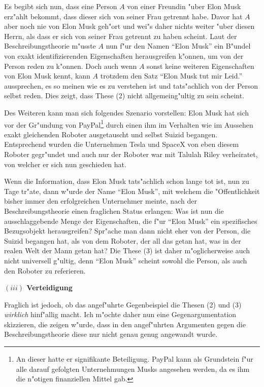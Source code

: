 \documentclass[a4paper, emulatestandardclasses, 12pt]{scrartcl}
\begin{document}
\begin{onehalfspace}
Es begibt sich nun, dass eine Person $A$ von einer Freundin "uber Elon Musk erz"ahlt bekommt, dass dieser sich von seiner Frau getrennt habe. Davor hat $A$ aber noch nie von Elon Musk geh"ort und wei"s daher nichts weiter "uber diesen Herrn, als dass er sich von seiner Frau getrennt zu haben scheint. Laut der Beschreibungstheorie m"usste $A$ nun f"ur den Namen "`Elon Musk"' ein B"undel von exakt identifizierenden Eigenschaften herausgreifen k"onnen, um von der Person reden zu k"onnen. Doch auch wenn $A$ sonst keine weiteren Eigenschaften von Elon Musk kennt, kann $A$ trotzdem den Satz "`Elon Musk tut mir Leid."' aussprechen, es so meinen wie es zu verstehen ist und tats"achlich von der Person selbst reden. Dies zeigt, dass These (2) nicht allgemeing"ultig zu sein scheint.
 
Des Weiteren kann man sich folgendes Szenario vorstellen: Elon Musk hat sich vor der Gr"undung von PayPal\footnote{An dieser hatte er signifikante Beteiligung. PayPal kann als Grundstein f"ur alle darauf gefolgten Unternehmungen Musks angesehen werden, da es ihm die n"otigen finanziellen Mittel gab.} durch einen ihm im Verhalten wie im Aussehen exakt gleichenden Roboter ausgetauscht und selbst Suizid begangen.  Entsprechend wurden die Unternehmen Tesla und SpaceX von eben diesem Roboter gegr"undet und auch nur der Roboter war mit Talulah Riley verheiratet, von welcher er sich nun geschieden hat.

Wenn die Information, dass Elon Musk tats"achlich schon lange tot ist, nun zu Tage tr"ate, dann w"urde der Name "`Elon Musk"', mit welchem die "Offentlichkeit bisher immer den erfolgreichen Unternehmer meinte, nach der Beschreibungstheorie einen fraglichen Status erlangen: Was ist nun die ausschlaggebende Menge der Eigenschaften, die f"ur "`Elon Musk"' ein spezifisches Bezugsobjekt herausgreifen? Spr"ache man dann nicht eher von der Person, die Suizid begangen hat, als von dem Roboter, der all das getan hat, was in der realen Welt der Mann getan hat? Die These (3) ist daher m"oglicherweise auch nicht universell g"ultig, denn  "`Elon Musk"' scheint sowohl die Person, als auch den Roboter zu referieren.

\vspace{5mm}
\noindent\textbf{$(iii)$ Verteidigung}	

\noindent Fraglich ist jedoch, ob das angef"uhrte Gegenbeispiel die Thesen (2) und (3) \emph{wirklich} hinf"allig macht. Ich m"ochte daher nun eine Gegenargumentation skizzieren, die zeigen w"urde, dass in den angef"uhrten Argumenten gegen die Beschreibungstheorie diese nur nicht genau genug angewandt wurde.


\end{onehalfspace}
\end{document}
